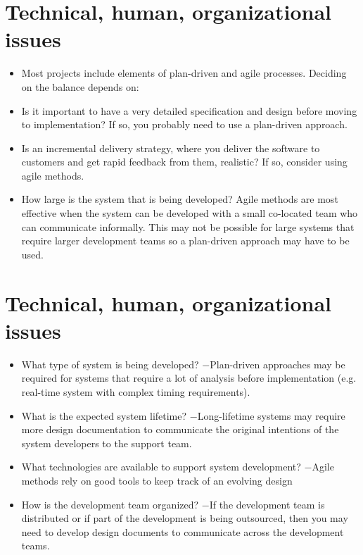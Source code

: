  \section{ Technical, human, organizational issues}
 \begin{itemize}

\item Most projects include elements of plan-driven and agile processes. Deciding on the balance depends on:

\item Is it important to have a very detailed specification and design before moving to implementation? If so, you probably need to use a plan-driven approach.
\item Is an incremental delivery strategy, where you deliver the software to customers and get rapid feedback from them, realistic? If so, consider using agile methods.
\item How large is the system that is being developed? Agile methods are most effective when the system can be developed with a small co-located team who can communicate informally. This may not be possible for large systems that require larger development teams so a plan-driven approach may have to be used.


\end{itemize}
\section{ Technical, human, organizational issues}
\begin{itemize}

\item What type of system is being developed?
\newline $-$Plan-driven approaches may be required for systems that require a lot of analysis before implementation (e.g. real-time system with complex timing requirements).
\item What is the expected system lifetime?
\newline $-$Long-lifetime systems may require more design documentation to communicate the original intentions of the system developers to the support team.
\item What technologies are available to support system development?
\newline $-$Agile methods rely on good tools to keep track of an evolving design
\item How is the development team organized?
\newline $-$If the development team is distributed or if part of the development is being outsourced, then you may need to develop design documents to communicate across the development teams.
\end{itemize}

